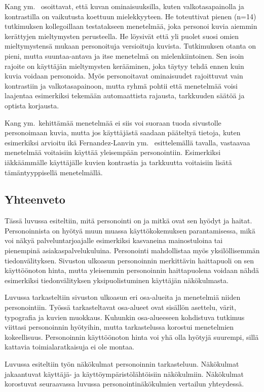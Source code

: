 \documentclass[finnish, 12pt, a4paper, elec, utf8, a-1b, online]{aaltothesis}
\begin{document}
Kang ym.~\cite{5539850} osoittavat, että kuvan ominaisuuksilla, kuten
valkotasapainolla ja kontrastilla on vaikutusta koettuun mielekkyyteen. He
toteuttivat pienen (n=14) tutkimuksen kollegoillaan testatakseen menetelmää,
joka personoi kuvia aiemmin kerättyjen mieltymysten perusteella. He löysivät
että yli puolet suosi omien mieltymystensä mukaan personoituja versioituja
kuvista. Tutkimuksen otanta on pieni, mutta suuntaa-antava ja itse menetelmä on
mielenkiintoinen. Sen isoin rajoite on käyttäjän mieltymysten kerääminen, joka
täytyy tehdä ennen kuin kuvia voidaan personoida. Myös personoitavat
ominaisuudet rajoittuvat vain kontrastiin ja valkotasapainoon, mutta ryhmä
pohtii että menetelmää voisi laajentaa esimerkiksi tekemään automaattista
rajausta, tarkkuuden säätöä ja optista korjausta.

Kang ym.~kehittämää menetelmää ei siis voi suoraan tuoda sivustolle
personoimaan kuvia, mutta jos käyttäjästä saadaan pääteltyä tietoja, kuten
esimerkiksi arvioitu ikä Fernandez-Lanvin ym.~\cite{fernandez2018dimension}
esittelemällä tavalla, vastaavaa menetelmää voitaisiin käyttää yleisempään
personointiin. Esimerkiksi iäkkäämmälle käyttäjälle kuvien kontrastia ja
tarkkuutta voitaisiin lisätä tämäntyyppisellä menetelmällä.

\subsection{Yhteenveto}

Tässä luvussa esiteltiin, mitä personointi on ja mitkä ovat sen hyödyt ja
haitat. Personoinnista on hyötyä muun muassa käyttökokemuksen parantamisessa,
mikä voi näkyä palveluntarjoajalle esimerkiksi kasvaneina mainostuloina tai
pienempinä asiakaspalvelukuluina. Personointi mahdollistaa myös yksilöllisemmän
tiedonvälityksen. Sivuston ulkoasun personoinnin merkittävin haittapuoli on sen
käyttöönoton hinta, mutta yleisemmin personoinnin haittapuolena voidaan nähdä
esimerkiksi tiedonvälityksen yksipuolistuminen käyttäjän näkökulmasta.

Luvussa tarkasteltiin sivuston ulkoasun eri osa-alueita ja menetelmiä niiden
personointiin. Työssä tarkasteltavat osa-alueet ovat sisällön asettelu, värit,
typografia ja kuvien muokkaus. Kuhunkin osa-alueeseen kohdistuva tutkimus
viittasi personoinnin hyötyihin, mutta tarkastelussa korostui menetelmien
kokeellisuus. Personoinnin käyttöönoton hinta voi yhä olla hyötyjä suurempi,
sillä kattavia toimialaratkaisuja ei ole montaa.

Luvussa esiteltiin työn näkökulmat personoinnin tarkasteluun. Näkökulmat
jakaantuvat käyttäjä- ja käyttöympäristölähtöisiin näkökulmiin. Näkökulmat
korostuvat seuraavassa luvussa personointinäkökulmien vertailun yhteydessä.
\end{document}
